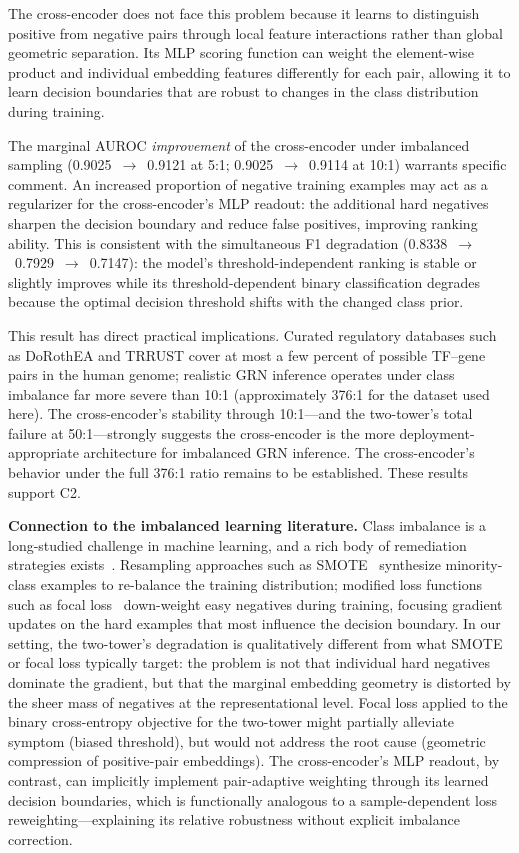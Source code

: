 \documentclass[journal]{IEEEtran}
\begin{document}
The cross-encoder does not face this problem because it learns to distinguish
positive from negative pairs through local feature interactions rather than
global geometric separation. Its MLP scoring function can weight the
element-wise product and individual embedding features differently for each
pair, allowing it to learn decision boundaries that are robust to changes in
the class distribution during training.

The marginal AUROC \emph{improvement} of the cross-encoder under imbalanced
sampling (0.9025~$\to$~0.9121 at 5:1; 0.9025~$\to$~0.9114 at 10:1) warrants
specific comment. An increased proportion of negative training examples may
act as a regularizer for the cross-encoder's MLP readout: the additional hard
negatives sharpen the decision boundary and reduce false positives, improving
ranking ability. This is consistent with the simultaneous F1 degradation
(0.8338~$\to$~0.7929~$\to$~0.7147): the model's threshold-independent ranking
is stable or slightly improves while its threshold-dependent binary
classification degrades because the optimal decision threshold shifts with
the changed class prior.

This result has direct practical implications. Curated regulatory databases
such as DoRothEA and TRRUST cover at most a few percent of possible TF--gene
pairs in the human genome; realistic GRN inference operates under
class imbalance far more severe than 10:1 (approximately 376:1 for the
dataset used here). The cross-encoder's stability through 10:1---and the
two-tower's total failure at 50:1---strongly suggests the cross-encoder is the
more deployment-appropriate architecture for imbalanced GRN inference.
The cross-encoder's behavior under the full 376:1 ratio remains to be
established. These results support C2.

\textbf{Connection to the imbalanced learning literature.} Class imbalance
is a long-studied challenge in machine learning, and a rich body of
remediation strategies exists~\cite{he2009}. Resampling approaches such as
SMOTE~\cite{chawla2002} synthesize minority-class examples to re-balance the
training distribution; modified loss functions such as focal loss~\cite{lin2017}
down-weight easy negatives during training, focusing gradient updates on the
hard examples that most influence the decision boundary. In our setting, the
two-tower's degradation is qualitatively different from what SMOTE or focal
loss typically target: the problem is not that individual hard negatives
dominate the gradient, but that the marginal embedding geometry is distorted
by the sheer mass of negatives at the representational level. Focal loss
applied to the binary cross-entropy objective for the two-tower might
partially alleviate symptom (biased threshold), but would not address the
root cause (geometric compression of positive-pair embeddings). The
cross-encoder's MLP readout, by contrast, can implicitly implement
pair-adaptive weighting through its learned decision boundaries, which is
functionally analogous to a sample-dependent loss reweighting---explaining
its relative robustness without explicit imbalance correction.
\end{document}
